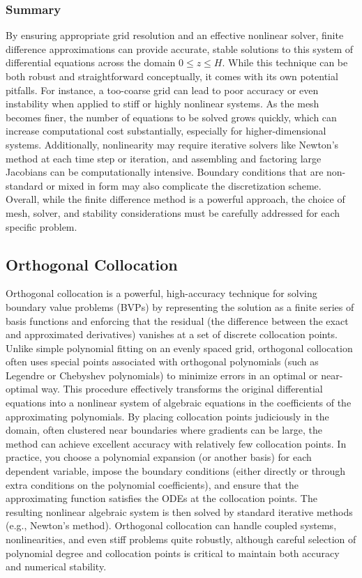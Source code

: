 \documentclass[a4paper,fleqn]{cas-sc}
\begin{document}
    \subsubsection*{Summary}
    By ensuring appropriate grid resolution and an effective nonlinear solver, finite difference approximations can provide accurate, stable solutions to this system of differential equations across the domain $0 \le z \le H$. While this technique can be both robust and straightforward conceptually, it comes with its own potential pitfalls. For instance, a too-coarse grid can lead to poor accuracy or even instability when applied to stiff or highly nonlinear systems. As the mesh becomes finer, the number of equations to be solved grows quickly, which can increase computational cost substantially, especially for higher-dimensional systems. Additionally, nonlinearity may require iterative solvers like Newton’s method at each time step or iteration, and assembling and factoring large Jacobians can be computationally intensive. Boundary conditions that are non-standard or mixed in form may also complicate the discretization scheme. Overall, while the finite difference method is a powerful approach, the choice of mesh, solver, and stability considerations must be carefully addressed for each specific problem.

    \subsection{Orthogonal Collocation}
    Orthogonal collocation is a powerful, high-accuracy technique for solving boundary value problems (BVPs) by representing the solution as a finite series of basis functions and enforcing that the residual (the difference between the exact and approximated derivatives) vanishes at a set of discrete collocation points. Unlike simple polynomial fitting on an evenly spaced grid, orthogonal collocation often uses special points associated with orthogonal polynomials (such as Legendre or Chebyshev polynomials) to minimize errors in an optimal or near-optimal way. This procedure effectively transforms the original differential equations into a nonlinear system of algebraic equations in the coefficients of the approximating polynomials. By placing collocation points judiciously in the domain, often clustered near boundaries where gradients can be large, the method can achieve excellent accuracy with relatively few collocation points. In practice, you choose a polynomial expansion (or another basis) for each dependent variable, impose the boundary conditions (either directly or through extra conditions on the polynomial coefficients), and ensure that the approximating function satisfies the ODEs at the collocation points. The resulting nonlinear algebraic system is then solved by standard iterative methods (e.g., Newton’s method). Orthogonal collocation can handle coupled systems, nonlinearities, and even stiff problems quite robustly, although careful selection of polynomial degree and collocation points is critical to maintain both accuracy and numerical stability.
\end{document}
